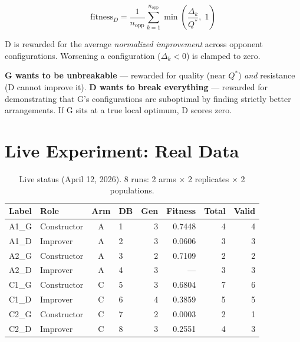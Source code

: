 \documentclass[11pt,a4paper]{article}
\newcommand{\Qstar}{Q^{*}}      %
\begin{document}
\begin{equation}
  \text{fitness}_D = \frac{1}{n_{\text{opp}}} \sum_{k=1}^{n_{\text{opp}}} \min\!\left(\frac{\Delta_k}{\Qstar},\; 1\right)
  \label{eq:fitnessD}
\end{equation}

D is rewarded for the average \emph{normalized improvement} across opponent configurations.  Worsening a configuration ($\Delta_k < 0$) is clamped to zero.

\begin{eli5box}
\textbf{G wants to be unbreakable} --- rewarded for quality (near $\Qstar$) \emph{and} resistance (D cannot improve it).  \textbf{D wants to break everything} --- rewarded for demonstrating that G's configurations are suboptimal by finding strictly better arrangements.  If G sits at a true local optimum, D scores zero.
\end{eli5box}

\section{Live Experiment: Real Data}

\begin{table}[H]
\centering\small
\begin{tabular}{@{}llclrrrr@{}}
\toprule
\textbf{Label} & \textbf{Role} & \textbf{Arm} & \textbf{DB} & \textbf{Gen} & \textbf{Fitness} & \textbf{Total} & \textbf{Valid} \\
\midrule
A1\_G & Constructor & A & 1 & 3 & 0.7448 & 4 & 4 \\
A1\_D & Improver & A & 2 & 3 & 0.0606 & 3 & 3 \\
A2\_G & Constructor & A & 3 & 2 & 0.7109 & 2 & 2 \\
A2\_D & Improver & A & 4 & 3 & --- & 3 & 3 \\
\midrule
C1\_G & Constructor & C & 5 & 3 & 0.6804 & 7 & 6 \\
C1\_D & Improver & C & 6 & 4 & 0.3859 & 5 & 5 \\
C2\_G & Constructor & C & 7 & 2 & 0.0003 & 2 & 1 \\
C2\_D & Improver & C & 8 & 3 & 0.2551 & 4 & 3 \\
\bottomrule
\end{tabular}
\caption{Live status (April 12, 2026). 8 runs: 2 arms $\times$ 2 replicates $\times$ 2 populations.}
\end{table}
\end{document}
